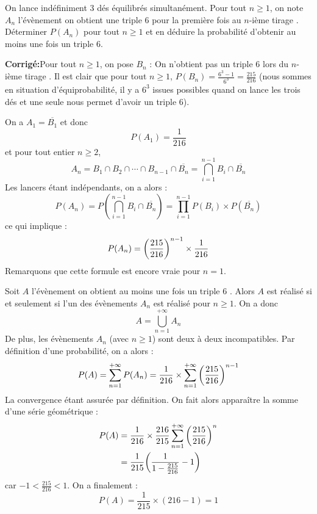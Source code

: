 \documentclass[a4paper,twoside,french,10pt]{VcCours}
\newcommand{\corr}{\textbf{Corrigé:}}
\begin{document}
\begin{Exercice}{} On lance indéfiniment 3 dés équilibrés simultanément. Pour tout $n \geq 1$, on note $A_n$ l'évènement \og on obtient une triple 6 pour la première fois au $n$-ième tirage \fg . Déterminer $P(A_n)$ pour tout $n \geq 1$ et en déduire la probabilité d'obtenir au moins une fois un triple $6$.
\end{Exercice}

\corr Pour tout $n \geq 1$, on pose $B_n$ : \og On n'obtient pas un triple 6 lors du $n$-ième tirage \fg . Il est clair que pour tout $n \geq 1$, $P(B_n) = \frac{6^3-1}{6^3} = \frac{215}{216}$ (nous sommes en situation d'équiprobabilité, il y a $6^3$ issues possibles quand on lance les trois dés et une seule nous permet d'avoir un triple $6$).



\noindent On a $A_1=\overline{B_1}$ et donc 
$$P(A_1) = \frac{1}{216}$$
et pour tout entier $n \geq 2$, 
$$A_n = B_1 \cap B_2 \cap \cdots \cap B_{n-1} \cap \overline{B_n} = \bigcap_{i=1}^{n-1} B_i \cap \overline{B_n}$$
Les lancers étant indépendants, on a alors :
\[ P(A_n) = P(\bigcap_{i=1}^{n-1} B_i \cap \overline{B_n}) = \prod_{i=1}^{n-1} P(B_i) \times P( \overline{B_n})\]
ce qui implique :
\[ P(A_n) = \bigg{(} \frac{215}{216} \bigg{)}^{n-1} \times \frac{1}{216} \]
Remarquons que cette formule est encore vraie pour $n=1$.


\noindent Soit $A$ l'évènement \og on obtient au moins une fois un triple $6$ \fg . Alors $A$ est réalisé si et seulement si l'un des évènements $A_n$ est réalisé pour $n \geq 1$. On a donc 
$$A= \bigcup_{n=1}^{+ \infty} A_n$$
De plus, les évènements $A_n$ (avec $n \geq 1$) sont deux à deux incompatibles. Par définition d'une probabilité, on a alors :
\[ P(A) = \sum_{n=1}^{+ \infty} P(A_n) = \frac{1}{216} \times \sum_{n=1}^{+ \infty} \bigg{(} \frac{215}{216} \bigg{)}^{n-1} \]
La convergence étant assurée par définition. On fait alors apparaître la somme d'une série géométrique :
\begin{align*}
P(A) & = \frac{1}{216} \times \frac{216}{215} \sum_{n=1}^{+ \infty} \bigg{(} \frac{215}{216} \bigg{)}^{n} \\
& = \frac{1}{215} \bigg{(} \frac{1}{1-\frac{215}{216}} - 1 \bigg{)} 
\end{align*}
car $-1 < \frac{215}{216} < 1$. On a finalement :
\[ P(A) = \frac{1}{215} \times (216-1) = 1 \]
\end{document}
